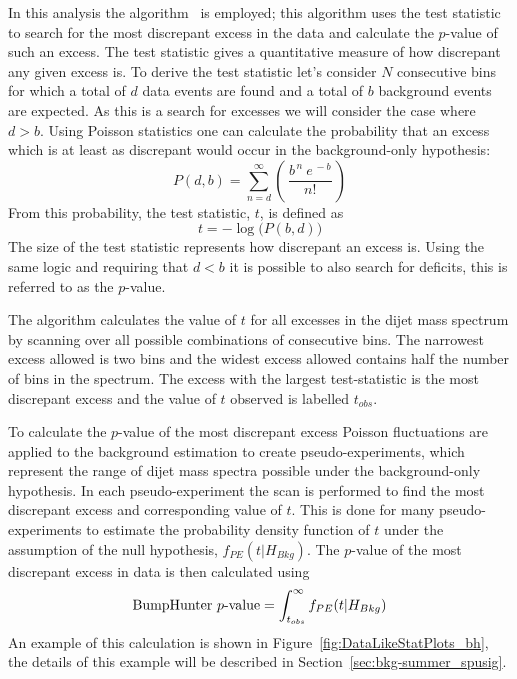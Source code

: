 In this analysis the \bh{} algorithm~\cite{dibjet-bh} is employed;
this algorithm uses the \bh{} test statistic to 
search for the most discrepant excess in the data
and calculate the \mbox{$p$-value} of such an excess.
The \bh{} test statistic gives a quantitative measure of how discrepant any given excess is.
To derive the test statistic let's consider $N$ consecutive bins for which
a total of $d$ data events are found and a total of $b$ background events are expected.
As this is a search for excesses we will consider the case where $d > b$.
Using Poisson statistics one can calculate the probability that an excess which is at least as discrepant
would occur in the background-only hypothesis:
\begin{equation}
  P(d,b) = \sum_{n=d}^{\infty} \left(\,\frac{b^{\,n}~e^{\,-b}}{n!}\,\right)
\end{equation}
From this probability, the \bh{} test statistic, $t$, is defined as
\begin{equation}
 t = -\log{\big(P(b,d)\big)}
\end{equation}
The size of the test statistic represents how discrepant an excess is.
Using the same logic and requiring that $d < b$ it is possible to also search for deficits,
this is referred to as the \dhunt{} \mbox{$p$-value}.

The \bh{} algorithm calculates the value of $t$ for all excesses in the dijet mass spectrum
by scanning over all possible combinations of consecutive bins.
The narrowest excess allowed is two bins and the widest excess allowed contains half the number of bins in the spectrum.
The excess with the largest \bh{} test-statistic is the most discrepant excess and the value of $t$ observed is labelled $t_{obs}$.

To calculate the \mbox{$p$-value} of the most discrepant excess
Poisson fluctuations are applied to the background estimation to create pseudo-experiments,
which represent the range of dijet mass spectra possible under the background-only hypothesis.
In each pseudo-experiment the \bh{} scan is performed to find the most discrepant excess and corresponding value of $t$.
This is done for many pseudo-experiments to estimate the probability density function of $t$ under the assumption of the null hypothesis, $f_{PE}(t| H_{Bkg})$.
The \bh{} \mbox{$p$-value} of the most discrepant excess in data is then calculated using
\begin{equation}
  \text{BumpHunter{}}~p\text{-value} = \int_{t_{obs}}^\infty f_{PE}(t | H_{Bkg})
\end{equation}
An example of this calculation is shown in Figure~\ref{fig:DataLikeStatPlots_bh},
the details of this example will be described in Section~\ref{sec:bkg-summer_spusig}.


